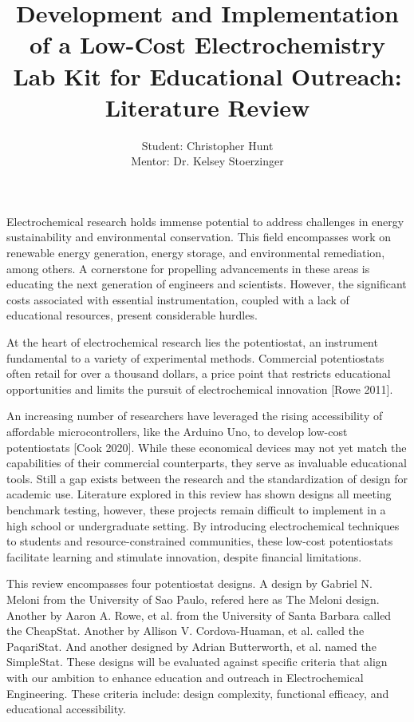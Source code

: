 \documentclass{article}
\title{\textcolor{mycolor}{\textbf{{\huge Development and Implementation of a Low-Cost Electrochemistry Lab Kit for Educational Outreach: Literature Review}}}}
\author{Student: Christopher Hunt \\ Mentor: Dr. Kelsey Stoerzinger}
\date{}
\begin{document}
\pagestyle{fancy}
\fancyhf{}
\rfoot{}
\rhead{\thepage}
\maketitle
Electrochemical research holds immense potential to address challenges in energy sustainability and environmental conservation. This field encompasses work on renewable energy generation, energy storage, and environmental remediation, among others. A cornerstone for propelling advancements in these areas is educating the next generation of engineers and scientists. However, the significant costs associated with essential instrumentation, coupled with a lack of educational resources, present considerable hurdles.

At the heart of electrochemical research lies the potentiostat, an instrument fundamental to a variety of experimental methods. Commercial potentiostats often retail for over a thousand dollars, a price point that restricts educational opportunities and limits the pursuit of electrochemical innovation [Rowe 2011].

An increasing number of researchers have leveraged the rising accessibility of affordable microcontrollers, like the Arduino Uno, to develop low-cost potentiostats [Cook 2020]. While these economical devices may not yet match the capabilities of their commercial counterparts, they serve as invaluable educational tools. Still a gap exists between the research and the standardization of design for academic use. Literature explored in this review has shown designs all meeting benchmark testing, however, these projects remain difficult to implement in a high school or undergraduate setting. By introducing electrochemical techniques to students and resource-constrained communities, these low-cost potentiostats facilitate learning and stimulate innovation, despite financial limitations.

This review encompasses four potentiostat designs. A design by Gabriel N. Meloni from the University of Sao Paulo, refered here as The Meloni design. Another by Aaron A. Rowe, et al. from the University of Santa Barbara called the CheapStat. Another by Allison V. Cordova-Huaman, et al. called the PaqariStat. And another designed by Adrian Butterworth, et al. named the SimpleStat. These designs will be evaluated against specific criteria that align with our ambition to enhance education and outreach in Electrochemical Engineering. These criteria include: design complexity, functional efficacy, and educational accessibility. 
 
\end{document}
